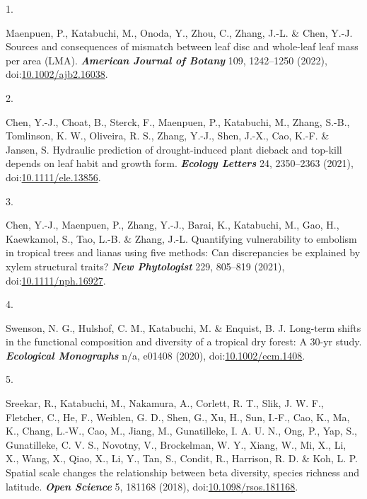 \documentclass[
]{article}
\newlength{\cslhangindent}
\newlength{\csllabelwidth}
\newlength{\cslentryspacingunit} %
\newenvironment{CSLReferences}[2] %
 {%
  \setlength{\parindent}{0pt}
  \ifodd #1
  \let\oldpar\par
  \def\par{\hangindent=\cslhangindent\oldpar}
  \fi
  \setlength{\parskip}{#2\cslentryspacingunit}
 }%
 {}
\newcommand{\CSLLeftMargin}[1]{\parbox[t]{\csllabelwidth}{#1}}
\newcommand{\CSLRightInline}[1]{\parbox[t]{\linewidth - \csllabelwidth}{#1}\break}
\begin{document}
\hypertarget{refs}{}
\begin{CSLReferences}{0}{0}
\leavevmode{}%
\CSLLeftMargin{1. }%
\CSLRightInline{Maenpuen, P., Katabuchi, M., Onoda, Y., Zhou, C., Zhang,
J.-L. \& Chen, Y.-J. Sources and consequences of mismatch between leaf
disc and whole-leaf leaf mass per area ({LMA}). \textbf{\emph{American
Journal of Botany}} 109, 1242--1250 (2022),
doi:\href{https://doi.org/10.1002/ajb2.16038}{10.1002/ajb2.16038}.}

\leavevmode{}%
\CSLLeftMargin{2. }%
\CSLRightInline{Chen, Y.-J., Choat, B., Sterck, F., Maenpuen, P.,
Katabuchi, M., Zhang, S.-B., Tomlinson, K. W., Oliveira, R. S., Zhang,
Y.-J., Shen, J.-X., Cao, K.-F. \& Jansen, S. Hydraulic prediction of
drought-induced plant dieback and top-kill depends on leaf habit and
growth form. \textbf{\emph{Ecology Letters}} 24, 2350--2363 (2021),
doi:\href{https://doi.org/10.1111/ele.13856}{10.1111/ele.13856}.}

\leavevmode{}%
\CSLLeftMargin{3. }%
\CSLRightInline{Chen, Y.-J., Maenpuen, P., Zhang, Y.-J., Barai, K.,
Katabuchi, M., Gao, H., Kaewkamol, S., Tao, L.-B. \& Zhang, J.-L.
Quantifying vulnerability to embolism in tropical trees and lianas using
five methods: Can discrepancies be explained by xylem structural traits?
\textbf{\emph{New Phytologist}} 229, 805--819 (2021),
doi:\href{https://doi.org/10.1111/nph.16927}{10.1111/nph.16927}.}

\leavevmode{}%
\CSLLeftMargin{4. }%
\CSLRightInline{Swenson, N. G., Hulshof, C. M., Katabuchi, M. \&
Enquist, B. J. Long-term shifts in the functional composition and
diversity of a tropical dry forest: A 30-yr study.
\textbf{\emph{Ecological Monographs}} n/a, e01408 (2020),
doi:\href{https://doi.org/10.1002/ecm.1408}{10.1002/ecm.1408}.}

\leavevmode{}%
\CSLLeftMargin{5. }%
\CSLRightInline{Sreekar, R., Katabuchi, M., Nakamura, A., Corlett, R.
T., Slik, J. W. F., Fletcher, C., He, F., Weiblen, G. D., Shen, G., Xu,
H., Sun, I.-F., Cao, K., Ma, K., Chang, L.-W., Cao, M., Jiang, M.,
Gunatilleke, I. A. U. N., Ong, P., Yap, S., Gunatilleke, C. V. S.,
Novotny, V., Brockelman, W. Y., Xiang, W., Mi, X., Li, X., Wang, X.,
Qiao, X., Li, Y., Tan, S., Condit, R., Harrison, R. D. \& Koh, L. P.
Spatial scale changes the relationship between beta diversity, species
richness and latitude. \textbf{\emph{Open Science}} 5, 181168 (2018),
doi:\href{https://doi.org/10.1098/rsos.181168}{10.1098/rsos.181168}.}


\end{CSLReferences}
\end{document}
